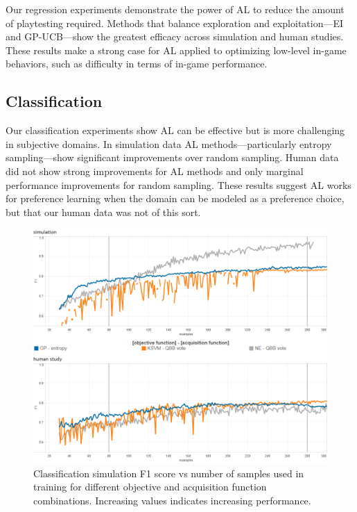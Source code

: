 \documentclass{sig-alternate}
\begin{document}
Our regression experiments demonstrate the power of AL to reduce the amount of playtesting required.
Methods that balance exploration and exploitation---EI and GP-UCB---show the greatest efficacy across simulation and human studies.
These results make a strong case for AL applied to optimizing low-level in-game behaviors, such as difficulty in terms of in-game performance.


\subsection{Classification}
Our classification experiments show AL can be effective but is more challenging in subjective domains.
In simulation data AL methods---particularly entropy sampling---show significant improvements over random sampling.
Human data did not show strong improvements for AL methods and only marginal performance improvements for random sampling.
These results suggest AL works for preference learning when the domain can be modeled as a preference choice, but that our human data was not of this sort.

\begin{figure}[tbph]
\centering
\includegraphics[width=\linewidth]{classification_results}
\caption{Classification simulation F1 score vs number of samples used in training for different objective and acquisition function combinations. Increasing values indicates increasing performance.}
\label{fig:cls_all}
\end{figure}
\end{document}
